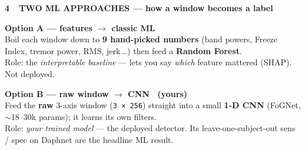 \documentclass[11pt]{article}
\newcommand{\code}[1]{{\footnotesize\color{muted}\texttt{#1}}}
\begin{document}
{\large\bfseries 4\ \ TWO ML APPROACHES — how a window becomes a label}\\[5pt]
\begin{minipage}[t]{0.49\textwidth}
  \begin{tcolorbox}[enhanced, equal height group=ml, colback=white, colframe=ink!55,
    boxrule=0.9pt, arc=3pt, left=9pt, right=9pt, top=6pt, bottom=6pt]
    {\bfseries Option A — features $\rightarrow$ classic ML}\\[3pt]
    Boil each window down to \textbf{9 hand-picked numbers} (band powers, Freeze Index,
    tremor power, RMS, jerk\,…) then feed a \textbf{Random Forest}.
    \\[3pt]
    {\footnotesize\color{muted}Role: the \emph{interpretable baseline} — lets you say
    \emph{which} feature mattered (SHAP). Not deployed.}
  \end{tcolorbox}
\end{minipage}\hfill
\begin{minipage}[t]{0.49\textwidth}
  \begin{tcolorbox}[enhanced, equal height group=ml, colback=tealbg, colframe=teal,
    boxrule=0.9pt, arc=3pt, left=9pt, right=9pt, top=6pt, bottom=6pt]
    {\bfseries\color{teal} Option B — raw window $\rightarrow$ CNN \ \small(yours)}\\[3pt]
    Feed the \textbf{raw} 3-axis window (\code{3 × 256}) straight into a small
    \textbf{1-D CNN} (FoGNet, $\sim$18–30k params); it learns its own filters.
    \\[3pt]
    {\footnotesize\color{muted}Role: \emph{your trained model} — the deployed
    detector. Its leave-one-subject-out sens / spec on Daphnet are the headline
    ML result.}
  \end{tcolorbox}
\end{minipage}

\vspace{8pt}
\end{document}
